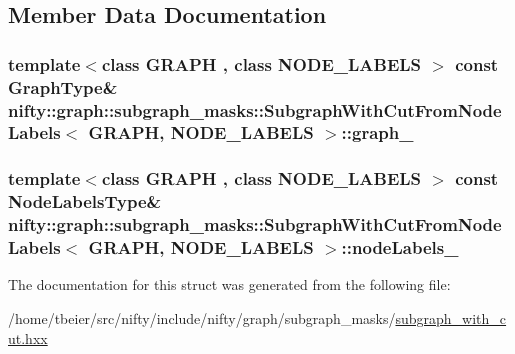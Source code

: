 \subsection{Member Data Documentation}
\hypertarget{structnifty_1_1graph_1_1subgraph__masks_1_1SubgraphWithCutFromNodeLabels_a1c05f51c94a45c331bfc87c01c14945f}{}
\subsubsection[{graph\+\_\+}]{\setlength{\rightskip}{0pt plus 5cm}template$<$class G\+R\+A\+P\+H , class N\+O\+D\+E\+\_\+\+L\+A\+B\+E\+L\+S $>$ const {\bf Graph\+Type}\& {\bf nifty\+::graph\+::subgraph\+\_\+masks\+::\+Subgraph\+With\+Cut\+From\+Node\+Labels}$<$ G\+R\+A\+P\+H, N\+O\+D\+E\+\_\+\+L\+A\+B\+E\+L\+S $>$\+::graph\+\_\+}\label{structnifty_1_1graph_1_1subgraph__masks_1_1SubgraphWithCutFromNodeLabels_a1c05f51c94a45c331bfc87c01c14945f}
\hypertarget{structnifty_1_1graph_1_1subgraph__masks_1_1SubgraphWithCutFromNodeLabels_ad5ab9c0ccfb9b5e654f60f1389df11af}{}
\subsubsection[{node\+Labels\+\_\+}]{\setlength{\rightskip}{0pt plus 5cm}template$<$class G\+R\+A\+P\+H , class N\+O\+D\+E\+\_\+\+L\+A\+B\+E\+L\+S $>$ const {\bf Node\+Labels\+Type}\& {\bf nifty\+::graph\+::subgraph\+\_\+masks\+::\+Subgraph\+With\+Cut\+From\+Node\+Labels}$<$ G\+R\+A\+P\+H, N\+O\+D\+E\+\_\+\+L\+A\+B\+E\+L\+S $>$\+::node\+Labels\+\_\+}\label{structnifty_1_1graph_1_1subgraph__masks_1_1SubgraphWithCutFromNodeLabels_ad5ab9c0ccfb9b5e654f60f1389df11af}


The documentation for this struct was generated from the following file\+:\begin{DoxyCompactItemize}
\item 
/home/tbeier/src/nifty/include/nifty/graph/subgraph\+\_\+masks/\hyperlink{subgraph__with__cut_8hxx}{subgraph\+\_\+with\+\_\+cut.\+hxx}\end{DoxyCompactItemize}
